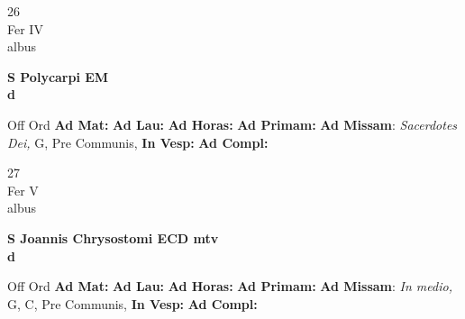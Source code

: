 \documentclass[10pt, openany]{book}
\begin{document}
        \begin{center}
            \begin{minipage}{3.5in}
                \vspace{2em}
                \begin{minipage}{0.5in}
                    {\Huge 26} \\
                    {\normalsize Fer IV} \\
                    {\normalsize albus}
                \end{minipage}
                \begin{minipage}{3.0in}
                    \textbf{ \large S Polycarpi EM \\
                    \textnormal{\normalsize d}} \\ 
                \end{minipage}
                \begin{justify}Off Ord
                    \textbf{Ad Mat: }
                    \textbf{Ad Lau: }
                    \textbf{Ad Horas: }
                    \textbf{Ad Primam: }\textbf{Ad Missam}: \textit{Sacerdotes Dei,} G, Pre Communis,  
                    \textbf{In Vesp: }
                    \textbf{Ad Compl: }
                \end{justify}
            \end{minipage}
        \end{center}
    
        \begin{center}
            \begin{minipage}{3.5in}
                \vspace{2em}
                \begin{minipage}{0.5in}
                    {\Huge 27} \\
                    {\normalsize Fer V} \\
                    {\normalsize albus}
                \end{minipage}
                \begin{minipage}{3.0in}
                    \textbf{ \large S Joannis Chrysostomi ECD mtv \\
                    \textnormal{\normalsize d}} \\ 
                \end{minipage}
                \begin{justify}Off Ord
                    \textbf{Ad Mat: }
                    \textbf{Ad Lau: }
                    \textbf{Ad Horas: }
                    \textbf{Ad Primam: }\textbf{Ad Missam}: \textit{In medio,} G, C, Pre Communis,  
                    \textbf{In Vesp: }
                    \textbf{Ad Compl: }
                \end{justify}
            \end{minipage}
        \end{center}
    
\end{document}
